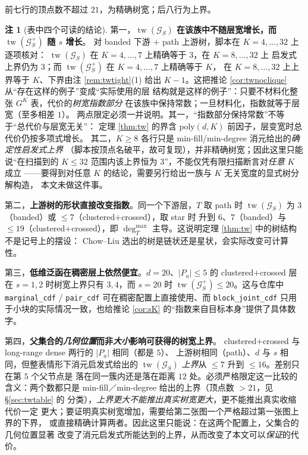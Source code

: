 \documentclass[a4paper,11pt]{article}
\theoremstyle{definition}
\newtheorem{remark}{注}
\newcommand{\1}{\mathbf 1}
\newcommand{\tw}{\operatorname{tw}}
\newcommand{\Gcal}{\mathcal G}
\begin{document}
前七行的顶点数不超过 $21$，为精确树宽；后八行为上界。

\begin{remark}[表中四个可读的结论]
\label{rem:twtable}
第一，\textbf{$\tw(\Gcal_S)$ 在该族中不随层宽增长，而 $\tw(\Gcal_S^{+})$ 随 $s$ 增长}。
对 banded 下游 $+$ path 上游树，脚本在 $K=4,\ldots,32$ 上逐项核对：
$\tw(\Gcal_S)$ 在 $K=4,\ldots,7$ 上精确等于 $3$，在 $K=8,\ldots,32$ 上
启发式上界仍为 $3$；而 $\tw(\Gcal_S^{+})$ 在 $K=4,\ldots,7$ 上精确等于 $K$，
在 $K=8,\ldots,32$ 上上界等于 $K$、下界由注 \ref{rem:twtight}(1) 给出
$K-1$。这把推论 \ref{cor:twnoclique} 从“存在这样的例子”变成“实际使用的层
结构就是这样的例子”：只要不材料化整张 $G^{K}$ 表，代价的\emph{树宽指数部分}
在该族中保持常数；一旦材料化，指数就等于层宽（至多相差 $1$）。
两点限定必须一并说明。其一，“指数部分保持常数”不等于“总代价与层宽无关”：
定理 \ref{thm:tw} 的界含 $\mathrm{poly}(d,K)$ 前因子，层变宽时总代价仍按多项式增长。
其二，$K\ge8$ 各行只是 min-fill/min-degree 消元给出的\emph{确定性启发式上界}
（脚本按顶点名破平，故可复现），并非精确树宽；因此这里只能说“在扫描到的
$K\le32$ 范围内该上界恒为 $3$”，不能仅凭有限扫描断言对\emph{任意} $K$ 成立
——要得到对任意 $K$ 的结论，需要另行给出一族与 $K$ 无关宽度的显式树分解构造，
本文未做这件事。

第二，\textbf{上游树的形状直接改变指数}。同一个下游层，$T$ 取 path 时
$\tw(\Gcal_S)$ 为 $3$（banded）或 $\le7$（clustered$+$crossed），取 star 时
升到 $6$、$7$（banded）与 $\le19$（clustered$+$crossed），即
$\deg_T^{\max}$ 主导。这说明定理 \ref{thm:tw} 中的树结构不是记号上的摆设：
Chow--Liu 选出的树是链状还是星状，会实际改变可计算性。

第三，\textbf{低维泛函在稠密层上依然便宜}。$d=20$、$|P_a|\le5$ 的
clustered$+$crossed 层在 $s=1,2$ 时树宽上界只有 $3,4$，而 $s=20$ 时
$\tw(\Gcal_S^{+})\le20$。这与仓库中 \texttt{marginal\_cdf} /
\texttt{pair\_cdf} 可在稠密配置上直接使用、而
\texttt{block\_joint\_cdf} 只用于小块的实际情况一致，也给推论
\ref{cor:sK} 的“指数来自目标本身”提供了具体数字。

第四，\textbf{父集合的\emph{几何位置}而非\emph{大小}影响可获得的树宽上界}。
clustered$+$crossed 与 long-range dense 两行的 $|P_a|$ 相同（都是 $5$）、
上游树相同（path）、$d$ 与 $s$ 相同，但整表情形下消元启发式给出的
$\tw(\Gcal_S)$ \emph{上界}从 $\le7$ 升到 $\le16$。差别只在第 $5$ 个父节点是
落在同一簇内还是落在距离 $12$ 处。必须严格限定这一比较的含义：两个数都只是
min-fill／min-degree 给出的上界（顶点数 $>21$，见 \S\ref{sec:twtable} 的
分类），\emph{上界更大不能推出真实树宽更大}，更不能推出真实收缩代价一定
更大；要证明真实树宽增加，需要给第二张图一个严格超过第一张图上界的下界，
或直接精确计算两者。因此这里只能说：在这两个配置上，父集合的几何位置显著
改变了消元启发式所能达到的上界，从而改变了本文可以\emph{保证}的代价。


\end{remark}
\end{document}
